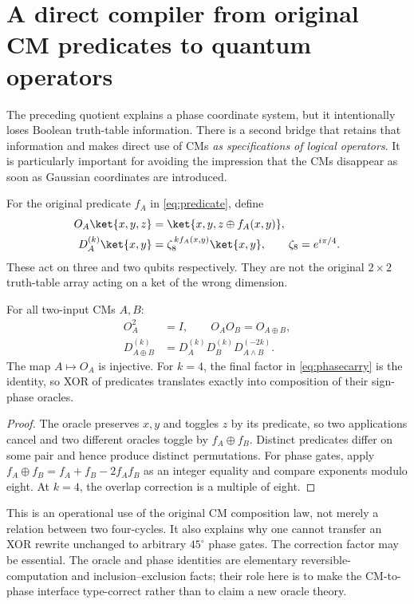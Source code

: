 \section{A direct compiler from original CM predicates to quantum operators}\label{sec:compiler}
The preceding quotient explains a phase coordinate system, but it intentionally loses Boolean truth-table information. There is a second bridge that retains that information and makes direct use of CMs \emph{as specifications of logical operators}. It is particularly important for avoiding the impression that the CMs disappear as soon as Gaussian coordinates are introduced.

\begin{definition}
For the original predicate $f_A$ in \cref{eq:predicate}, define
\begin{align}
 O_A\ket{x,y,z}&=\ket{x,y,z\oplus f_A(x,y)},\label{eq:oracle}\\
 D_A^{(k)}\ket{x,y}&=\zeta_8^{\,k f_A(x,y)}\ket{x,y},
 \qquad\zeta_8=e^{i\pi/4}.\label{eq:phaseoracle}
\end{align}
These act on three and two qubits respectively. They are not the original $2\times2$ truth-table array acting on a ket of the wrong dimension.
\end{definition}

\begin{proposition}\label{thm:compiler}
For all two-input CMs $A,B$:
\begin{align}
 O_A^2&=I,\qquad O_AO_B=O_{A\oplus B},\label{eq:oraclehom}\\
 D_{A\oplus B}^{(k)}
 &=D_A^{(k)}D_B^{(k)}D_{A\land B}^{(-2k)}.\label{eq:phasecarry}
\end{align}
The map $A\mapsto O_A$ is injective. For $k=4$, the final factor in \cref{eq:phasecarry} is the identity, so XOR of predicates translates exactly into composition of their sign-phase oracles.
\end{proposition}
\begin{proof}
The oracle preserves $x,y$ and toggles $z$ by its predicate, so two applications cancel and two different oracles toggle by $f_A\oplus f_B$. Distinct predicates differ on some pair and hence produce distinct permutations. For phase gates, apply $f_A\oplus f_B=f_A+f_B-2f_Af_B$ as an integer equality and compare exponents modulo eight. At $k=4$, the overlap correction is a multiple of eight.
\end{proof}
This is an operational use of the original CM composition law, not merely a relation between two four-cycles. It also explains why one cannot transfer an XOR rewrite unchanged to arbitrary $45^\circ$ phase gates. The correction factor may be essential.  The oracle and phase identities are elementary reversible-computation and inclusion--exclusion facts; their role here is to make the CM-to-phase interface type-correct rather than to claim a new oracle theory.

